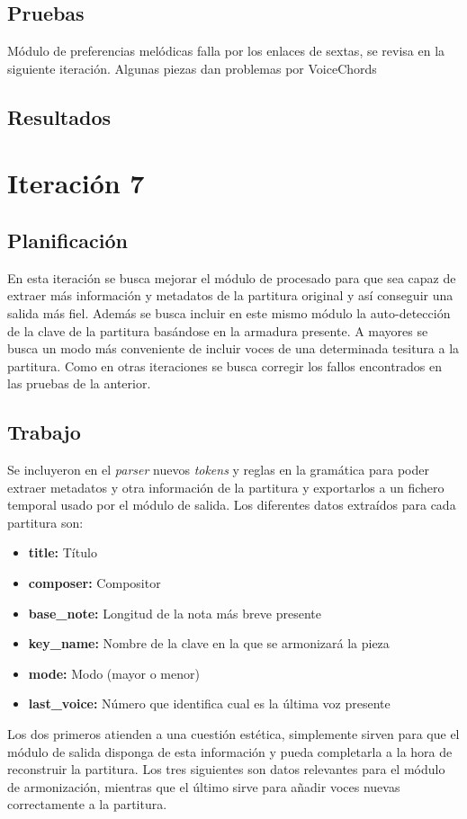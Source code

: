 \subsection{Pruebas}
Módulo de preferencias melódicas falla por los enlaces de sextas, se revisa en la siguiente iteración.
Algunas piezas dan problemas por VoiceChords

\subsection{Resultados}

\section{Iteración 7}
\subsection{Planificación}
En esta iteración se busca mejorar el módulo de procesado para que sea capaz de extraer más información y metadatos de la partitura original y así conseguir una salida más fiel. Además se busca incluir en este mismo módulo la auto-detección de la clave de la partitura basándose en la armadura presente. A mayores se busca un modo más conveniente de incluir voces de una determinada tesitura a la partitura. Como en otras iteraciones se busca corregir los fallos encontrados en las pruebas de la anterior.

\subsection{Trabajo}
Se incluyeron en el \textit{parser} nuevos \textit{tokens} y reglas en la gramática para poder extraer metadatos y otra información de la partitura y exportarlos a un fichero temporal usado por el módulo de salida. Los diferentes datos extraídos para cada partitura son:
\begin{itemize}
	\item \textbf{title:} Título
	\item \textbf{composer:} Compositor
	\item \textbf{base\_note:} Longitud de la nota más breve presente
	\item \textbf{key\_name:} Nombre de la clave en la que se armonizará la pieza
	\item \textbf{mode:} Modo (mayor o menor)
	\item \textbf{last\_voice:} Número que identifica cual es la última voz presente
\end{itemize}
Los dos primeros atienden a una cuestión estética, simplemente sirven para que el módulo de salida disponga de esta información y pueda completarla a la hora de reconstruir la partitura. Los tres siguientes son datos relevantes para el módulo de armonización, mientras que el último sirve para añadir voces nuevas correctamente a la partitura. 

